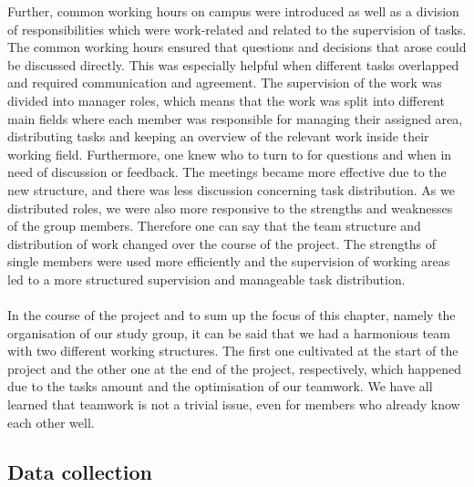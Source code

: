 Further, common working hours on campus were introduced as well as a division of responsibilities which were work-related and related to the supervision of tasks. The common working hours ensured that questions and decisions that arose could be discussed directly. This was especially helpful when different tasks overlapped and required communication and agreement.
The supervision of the work was divided into manager roles, which means that the work was split into different main fields where each member was responsible for managing their assigned area, distributing tasks and keeping an overview of the relevant work inside their working field. Furthermore, one knew who to turn to for questions and when in need of discussion or feedback. The meetings became more effective due to the new structure, and there was less discussion concerning task distribution. As we distributed roles, we were also more responsive to the strengths and weaknesses of the group members. Therefore one can say that the team structure and distribution of work changed over the course of the project. The strengths of single members were used more efficiently and the supervision of working areas led to a more structured supervision and manageable task distribution. \\
\\
In the course of the project and to sum up the focus of this chapter, namely the organisation of our study group, it can be said that we had a harmonious team with two different working structures. The first one cultivated at the start of the project and the other one at the end of the project, respectively, which happened due to the tasks amount and the optimisation of our teamwork. We have all learned that teamwork is not a trivial issue, even for members who already know each other well.


\subsection{Data collection}

